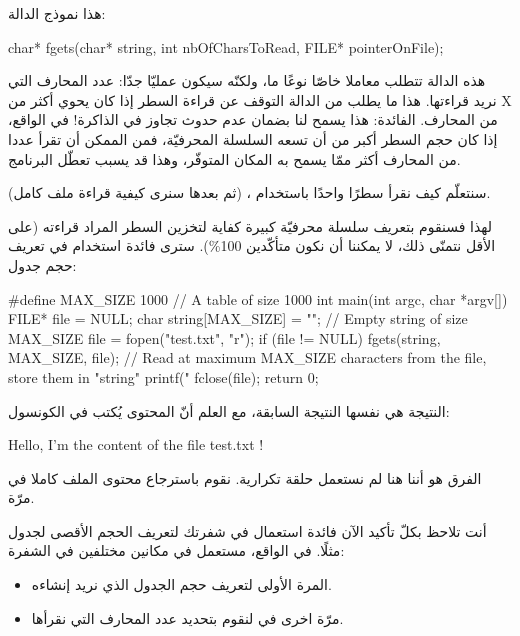 هذا نموذج الدالة:

\begin{Csource}
char* fgets(char* string, int nbOfCharsToRead, FILE* pointerOnFile);
\end{Csource}

هذه الدالة تتطلب معاملا خاصّا نوعًا ما، ولكنّه سيكون عمليّا جدّا: عدد المحارف التي نريد قراءتها. هذا ما يطلب من الدالة
التوقف عن قراءة السطر إذا كان يحوي أكثر من
\textenglish{X}
من المحارف.
الفائدة: هذا يسمح لنا بضمان عدم حدوث تجاوز في الذاكرة! في الواقع، إذا كان حجم السطر أكبر من أن تسعه السلسلة المحرفيّة، فمن الممكن أن تقرأ عددا من المحارف أكثر ممّا يسمح به المكان المتوفّر، وهذا قد يسبب تعطّل البرنامج.

سنتعلّم كيف نقرأ سطرًا واحدًا باستخدام
،
(ثم  بعدها سنرى كيفية قراءة ملف كامل).

لهذا فسنقوم بتعريف سلسلة محرفيّة كبيرة كفاية لتخزين السطر المراد قراءته (على الأقل نتمنّى ذلك، لا يمكننا أن نكون متأكّدين
100\%).
سترى فائدة استخدام 
في تعريف حجم جدول:

\begin{Csource}
#define MAX_SIZE 1000 // A table of size 1000
int main(int argc, char *argv[])
{
    FILE* file = NULL;
    char string[MAX_SIZE] = ""; // Empty string of size MAX_SIZE
    file = fopen("test.txt", "r");
    if (file != NULL)
    {
        fgets(string, MAX_SIZE, file); // Read at maximum MAX_SIZE characters from the file, store them in  "string"
        printf("%
        fclose(file);
    }
    return 0;
}
\end{Csource}

النتيجة هي نفسها النتيجة السابقة، مع العلم أنّ المحتوى يُكتب في الكونسول:

\begin{Console}
Hello, I'm the content of the file test.txt !
\end{Console}

الفرق هو أننا هنا لم نستعمل حلقة تكرارية. نقوم باسترجاع محتوى الملف كاملا في مرّة.

أنت تلاحظ بكلّ تأكيد الآن فائدة استعمال
في شفرتك لتعريف الحجم الأقصى لجدول مثلًا. في الواقع،
مستعمل في مكانين مختلفين في الشفرة:

\begin{itemize}
  \item المرة الأولى لتعريف حجم الجدول الذي نريد إنشاءه.
  \item مرّة اخرى في 
  لنقوم بتحديد عدد المحارف التي نقرأها.
\end{itemize}

